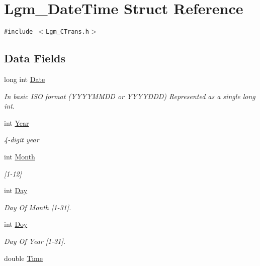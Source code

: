 \hypertarget{struct_lgm___date_time}{
\section{Lgm\_\-DateTime Struct Reference}
\label{struct_lgm___date_time}
}
{\tt \#include $<$Lgm\_\-CTrans.h$>$}

\subsection*{Data Fields}
\begin{CompactItemize}
\item 
long int \hyperlink{struct_lgm___date_time_8c1b7b17183e48a6fafaf6302e1b1da9}{Date}
\begin{CompactList}\small\item\em In basic ISO format (YYYYMMDD or YYYYDDD) Represented as a single long int. \item\end{CompactList}\item 
int \hyperlink{struct_lgm___date_time_42e645110404fbf4f10235789577fa32}{Year}
\begin{CompactList}\small\item\em 4-digit year \item\end{CompactList}\item 
int \hyperlink{struct_lgm___date_time_530b376ec91a278ac98531d3ea17f148}{Month}
\begin{CompactList}\small\item\em \mbox{[}1-12\mbox{]} \item\end{CompactList}\item 
int \hyperlink{struct_lgm___date_time_8f67164de537e3ec2b47e3204ddd3400}{Day}
\begin{CompactList}\small\item\em Day Of Month \mbox{[}1-31\mbox{]}. \item\end{CompactList}\item 
int \hyperlink{struct_lgm___date_time_72a1d4d4121176f8cf34faa09b5b4982}{Doy}
\begin{CompactList}\small\item\em Day Of Year \mbox{[}1-31\mbox{]}. \item\end{CompactList}\item 
double \hyperlink{struct_lgm___date_time_f51ff88ae9c6c4b9907f516c09ebf68f}{Time}

\end{CompactItemize}
